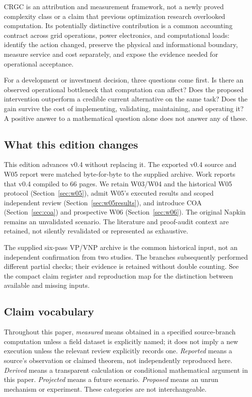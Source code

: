 \documentclass[11pt,letterpaper]{article}
\begin{document}
CRGC is an attribution and measurement framework, not a newly proved complexity class or a claim that previous optimization research overlooked computation. Its potentially distinctive contribution is a common accounting contract across grid operations, power electronics, and computational loads: identify the action changed, preserve the physical and informational boundary, measure service and cost separately, and expose the evidence needed for operational acceptance.

For a development or investment decision, three questions come first. Is there an observed operational bottleneck that computation can affect? Does the proposed intervention outperform a credible current alternative on the same task? Does the gain survive the cost of implementing, validating, maintaining, and operating it? A positive answer to a mathematical question alone does not answer any of these.

\subsection{What this edition changes}
This edition advances v0.4 without replacing it. The exported v0.4 source and W05 report were matched byte-for-byte to the supplied archive. Work reports that v0.4 compiled to 66 pages. We retain W03/W04 and the historical W05 protocol (Section~\ref{sec:w05}), admit W05's executed results and scoped independent review (Section~\ref{sec:w05results}), and introduce COA (Section~\ref{sec:coa}) and prospective W06 (Section~\ref{sec:w06}). The original Napkin remains an unvalidated scenario. The literature and proof-audit context are retained, not silently revalidated or represented as exhaustive.\cite{chatbranch,workbranch,w03packet,w03review,w04packet,w05packet,w05review}

The supplied six-pass VP/VNP archive is the common historical input, not an independent confirmation from two studies. The branches subsequently performed different partial checks; their evidence is retained without double counting. See the compact claim register and reproduction map for the distinction between available and missing inputs.

\subsection{Claim vocabulary}
Throughout this paper, \emph{measured} means obtained in a specified source-branch computation unless a field dataset is explicitly named; it does not imply a new execution unless the relevant review explicitly records one. \emph{Reported} means a source's observation or claimed theorem, not independently reproduced here. \emph{Derived} means a transparent calculation or conditional mathematical argument in this paper. \emph{Projected} means a future scenario. \emph{Proposed} means an unrun mechanism or experiment. These categories are not interchangeable.
\end{document}
